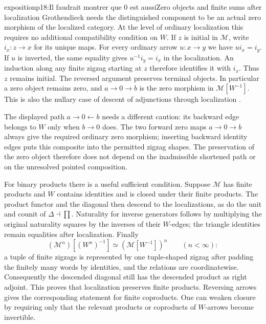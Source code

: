 \begin{dcomment}{exposition}{p18:Il faudrait montrer que 0 est aussi}{Zero objects and finite sums after localization}
Grothendieck needs the distinguished component to be an actual zero morphism of the localized category. At the level of ordinary localization this requires no additional compatibility condition on $W$. If $z$ is initial in $\mathcal M$, write $i_x:z\to x$ for its unique maps. For every ordinary arrow $u:x\to y$ we have $ui_x=i_y$. If $u$ is inverted, the same equality gives $u^{-1}i_y=i_x$ in the localization. An induction along any finite zigzag starting at $z$ therefore identifies it with $i_x$. Thus $z$ remains initial. The reversed argument preserves terminal objects. In particular a zero object remains zero, and $a\to0\to b$ is the zero morphism in $\mathcal M[W^{-1}]$. This is also the nullary case of descent of adjunctions through localization \citep[Lemma 1.1.6]{Krause2021}.

The displayed path $a\to0\leftarrow b$ needs a different caution: its backward edge belongs to $W$ only when $b\to0$ does. The two forward zero maps $a\to0\to b$ always give the required ordinary zero morphism; inserting backward identity edges puts this composite into the permitted zigzag shapes. The preservation of the zero object therefore does not depend on the inadmissible shortened path or on the unresolved pointed composition.

For binary products there is a useful sufficient condition. Suppose $\mathcal M$ has finite products and $W$ contains identities and is closed under their finite products. The product functor and the diagonal then descend to the localizations, as do the unit and counit of $\Delta\dashv\prod$. Naturality for inverse generators follows by multiplying the original naturality squares by the inverses of their $W$-edges; the triangle identities remain equalities after localization. Finally
\[
 (\mathcal M^n)[(W^n)^{-1}]
 \simeq (\mathcal M[W^{-1}])^n
 \qquad(n<\infty):
\]
a tuple of finite zigzags is represented by one tuple-shaped zigzag after padding the finitely many words by identities, and the relations are coordinatewise. Consequently the descended diagonal still has the descended product as right adjoint. This proves that localization preserves finite products. Reversing arrows gives the corresponding statement for finite coproducts. One can weaken closure by requiring only that the relevant products or coproducts of $W$-arrows become invertible.


\end{dcomment}
